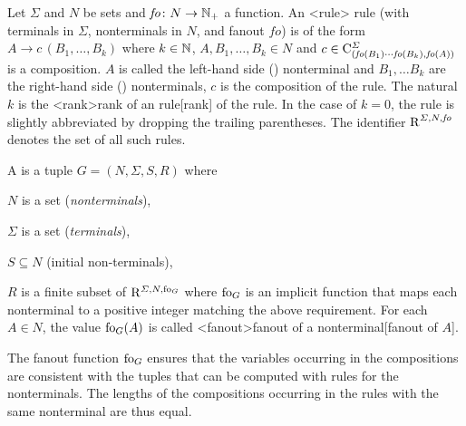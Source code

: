 \documentclass[../../document.tex]{subfiles}
\begin{document}
    \begin{definition}
        Let \(\varSigma\) and \(N\) be sets and \(\mathit{fo}\colon N \to \mathbb{N}_+\) a function.
        An <rule>{ rule} (with terminals in \(\varSigma\), nonterminals in \(N\), and fanout \(\mathit{fo}\)) is of the form \(A \to c\,(B_1, \ldots, B_k)\) where \(k \in \mathbb{N}\), \(A, B_1, \ldots, B_k \in N\) and \(c \in \mathrm{C}^\varSigma_{(\mathit{fo}(B_1) \cdots \mathit{fo}(B_k), \mathit{fo}(A))}\) is a composition.
        \(A\) is called the left-hand side () nonterminal and \(B_1, \ldots B_k\) are the right-hand side () nonterminals, \(c\) is the composition of the rule.
        The natural \(k\) is the <rank>{rank of an  rule}[rank] of the rule.
        In the case of \(k = 0\), the rule is slightly abbreviated by dropping the trailing parentheses.
        The identifier \(\operatorname{R}^{\varSigma, N, \mathit{fo}}\) denotes the set of all such  rules.

        A  is a tuple \(G=(N, \varSigma, S, R)\) where
        \begin{compactenum}
            \item \(N\) is a set (\emph{nonterminals}),
            \item \(\varSigma\) is a set (\emph{terminals}),
            \item \(S \subseteq N\) (initial non-terminals),
            \item \(R\) is a finite subset of \(\mathrm R^{\varSigma, N, \operatorname{fo}_G}\) where \(\operatorname{fo}_G\) is an implicit function that maps each nonterminal to a positive integer matching the above requirement. For each \(A \in N\), the value \(\operatorname{fo}_G(A)\) is called <fanout>{fanout of a nonterminal}[fanout of \(A\)].
        \end{compactenum}
    \end{definition}

    The fanout function \(\operatorname{fo}_G\) ensures that the variables occurring in the compositions are consistent with the tuples that can be computed with rules for the  nonterminals.
    The lengths of the compositions occurring in the rules with the same  nonterminal are thus equal.
\end{document}
